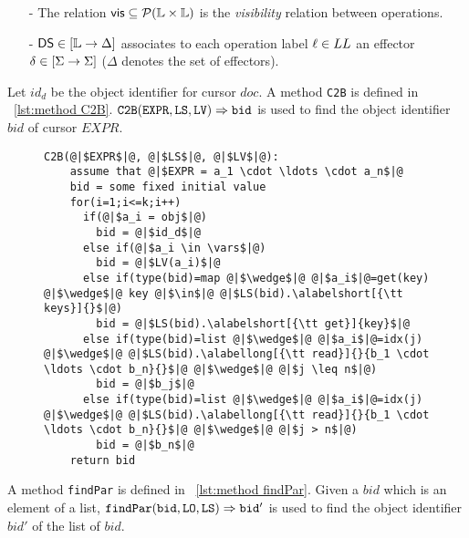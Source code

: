 {\begin{itemize}
\begin{itemize}
    \item[-] $LL \subseteq \labels$ is the set of operations which has been applied in a replica,
    \end{itemize}

\item[-] The relation $\mathsf{vis}\subseteq \mathcal{P}(\mathbb{L} \times \mathbb{L})$ is the \emph{visibility} relation between operations.

\item[-] $\mathsf{DS}\in [\mathbb{L} \rightarrow \Delta]$ associates to each operation label $\ell \in LL$ an effector $\delta\in [\Sigma \rightarrow \Sigma]$ ($\Delta$ denotes the set of effectors).
\end{itemize}

Let $id_d$ be the object identifier for cursor $doc$. A method {\tt C2B} is defined in \figureautorefname~\ref{lst:method C2B}. $\alabellong[{\tt C2B}]{EXPR,LS,LV}{bid}{}$ is used to find the object identifier $bid$ of cursor $EXPR$.

\begin{figure}[t]
\begin{lstlisting}[basicstyle=\ttfamily\scriptsize,caption={\vspace{-1mm}Method {\tt C2B}.},captionpos=b,label={lst:method C2B}]
  C2B(@|$EXPR$|@, @|$LS$|@, @|$LV$|@):
    assume that @|$EXPR = a_1 \cdot \ldots \cdot a_n$|@
    bid = some fixed initial value
    for(i=1;i<=k;i++)
      if(@|$a_i = obj$|@)
        bid = @|$id_d$|@
      else if(@|$a_i \in \vars$|@)
        bid = @|$LV(a_i)$|@
      else if(type(bid)=map @|$\wedge$|@ @|$a_i$|@=get(key) @|$\wedge$|@ key @|$\in$|@ @|$LS(bid).\alabelshort[{\tt keys}]{}$|@)
        bid = @|$LS(bid).\alabelshort[{\tt get}]{key}$|@
      else if(type(bid)=list @|$\wedge$|@ @|$a_i$|@=idx(j) @|$\wedge$|@ @|$LS(bid).\alabellong[{\tt read}]{}{b_1 \cdot \ldots \cdot b_n}{}$|@ @|$\wedge$|@ @|$j \leq n$|@)
        bid = @|$b_j$|@
      else if(type(bid)=list @|$\wedge$|@ @|$a_i$|@=idx(j) @|$\wedge$|@ @|$LS(bid).\alabellong[{\tt read}]{}{b_1 \cdot \ldots \cdot b_n}{}$|@ @|$\wedge$|@ @|$j > n$|@)
        bid = @|$b_n$|@
    return bid
\end{lstlisting}
\vspace{-5mm}
\end{figure}

A method {\tt findPar} is defined in \figureautorefname~\ref{lst:method findPar}. Given a $bid$ which is an element of a list, $\alabellong[{\tt findPar}]{bid,LO,LS}{bid'}{}$ is used to find the object identifier $bid'$ of the list of $bid$.

}
